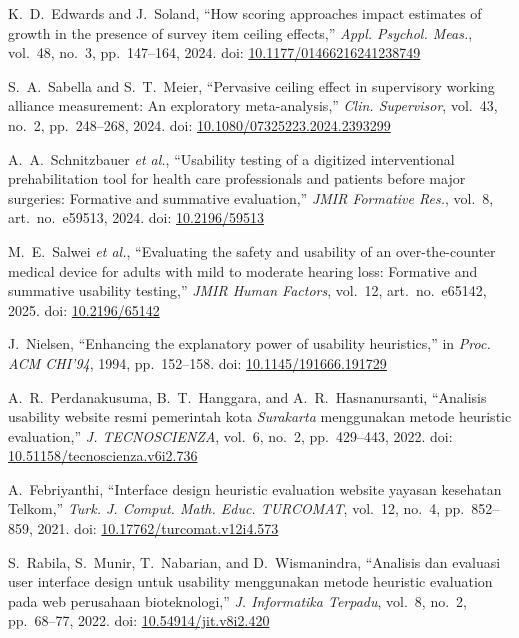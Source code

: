 \documentclass[conference]{IEEEtran}
\begin{document}
\begin{thebibliography}{}
K.~D.~Edwards and J.~Soland, ``How scoring approaches impact estimates of
growth in the presence of survey item ceiling effects,'' \emph{Appl.
Psychol. Meas.}, vol.~48, no.~3, pp.~147--164, 2024. doi:
\href{https://doi.org/10.1177/01466216241238749}{10.1177/01466216241238749}

S.~A.~Sabella and S.~T.~Meier, ``Pervasive ceiling effect in supervisory
working alliance measurement: An exploratory meta-analysis,''
\emph{Clin. Supervisor}, vol.~43, no.~2, pp.~248--268, 2024. doi:
\href{https://doi.org/10.1080/07325223.2024.2393299}{10.1080/07325223.2024.2393299}

A.~A.~Schnitzbauer \emph{et al.}, ``Usability testing of a digitized
interventional prehabilitation tool for health care professionals and
patients before major surgeries: Formative and summative evaluation,''
\emph{JMIR Formative Res.}, vol.~8, art.~no.~e59513, 2024. doi:
\href{https://doi.org/10.2196/59513}{10.2196/59513}

M.~E.~Salwei \emph{et al.}, ``Evaluating the safety and usability of an
over-the-counter medical device for adults with mild to moderate hearing
loss: Formative and summative usability testing,'' \emph{JMIR Human
Factors}, vol.~12, art.~no.~e65142, 2025. doi:
\href{https://doi.org/10.2196/65142}{10.2196/65142}

J.~Nielsen, ``Enhancing the explanatory power of usability heuristics,'' in
\emph{Proc. ACM CHI'94}, 1994, pp.~152--158. doi:
\href{https://doi.org/10.1145/191666.191729}{10.1145/191666.191729}

A.~R.~Perdanakusuma, B.~T.~Hanggara, and A.~R.~Hasnanursanti, ``Analisis
usability website resmi pemerintah kota \emph{Surakarta} menggunakan
metode heuristic evaluation,'' \emph{J. TECNOSCIENZA}, vol.~6, no.~2,
pp.~429--443, 2022. doi:
\href{https://doi.org/10.51158/tecnoscienza.v6i2.736}{10.51158/tecnoscienza.v6i2.736}

A.~Febriyanthi, ``Interface design heuristic evaluation website yayasan
kesehatan Telkom,'' \emph{Turk. J. Comput. Math. Educ. TURCOMAT}, vol.~12,
no.~4, pp.~852--859, 2021. doi:
\href{https://doi.org/10.17762/turcomat.v12i4.573}{10.17762/turcomat.v12i4.573}

S.~Rabila, S.~Munir, T.~Nabarian, and D.~Wismanindra, ``Analisis dan
evaluasi user interface design untuk usability menggunakan metode
heuristic evaluation pada web perusahaan bioteknologi,'' \emph{J.
Informatika Terpadu}, vol.~8, no.~2, pp.~68--77, 2022. doi:
\href{https://doi.org/10.54914/jit.v8i2.420}{10.54914/jit.v8i2.420}


\end{thebibliography}
\end{document}
